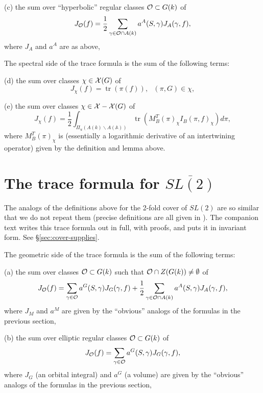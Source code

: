 \documentclass[12pt,letterpaper,openany]{book}
\theoremstyle{plain}
\theoremstyle{definition}
\theoremstyle{remark}
\theoremstyle{remark}
\newcommand{\tr}{\operatorname{tr}}
\begin{document}
(c) the sum over ``hyperbolic'' regular classes
${\cal{O}}\subset G(k)$
of
\begin{equation}
J_{\cal{O}}(f)=
{\frac{1}{2}}\sum_{\gamma\in {\cal O}\cap A(k)}
a^A(S,\gamma)J_A(\gamma,f),
\end{equation}
where $J_A$ and $a^A$ are as above,

The spectral side of the trace formula is the sum of the following terms:

(d) the sum over classes $\chi\in {\cal{X}}(G)$ of
\begin{equation}
J_\chi(f)=
\tr(\pi(f)),\ \ \ (\pi,G)\in\chi,
\end{equation}

(e) the sum over classes $\chi\in {\cal{X}}-{\cal{X}}(G)$ of
\begin{equation}
J_\chi(f)=
{\frac{1}{2}}\int_{\Pi_u(A(k)\backslash A({\mathbb{A}}))}
\tr(M_B^T(\pi)_\chi
I_B(\pi,f)_\chi)d\pi,
\end{equation}
where $M_B^T(\pi)_\chi$ is (essentially a logarithmic derivative
of an intertwining operator) given by the definition and lemma above.

\section{The trace formula for \texorpdfstring{$\overline{SL(2)}$}{SL(2)-bar}}

The analogs of the definitions above for the 2-fold cover of $SL(2)$
are so similar that we do not repeat them (precise definitions
are all given in \cite{J2}). The companion text \cite{JC} writes this
trace formula out in full, with proofs, and puts it in invariant form.
See \S\ref{sec:cover-supplies}.

The geometric side of the trace formula is the sum of the following terms:

(a) the sum over classes ${\cal{O}}\subset G(k)$
such that ${\cal{O}}\cap Z(G(k))\not= \emptyset$ of
\begin{equation}
J_{\cal{O}}(f)=
\sum_{\gamma\in {\cal O}}
a^G(S,\gamma)J_G(\gamma,f)+{\frac{1}{2}}
\sum_{\gamma\in {\cal O}\cap A(k)}
a^A(S,\gamma)J_A(\gamma,f),
\end{equation}
where $J_M$ and $a^M$
are given by the ``obvious'' analogs of the formulas
in the previous section,

(b) the sum over elliptic regular classes ${\cal{O}}\subset G(k)$
of
\begin{equation}
J_{\cal{O}}(f)=
\sum_{\gamma\in {\cal O}}
a^G(S,\gamma)J_G(\gamma,f),
\end{equation}
where $J_G$ (an orbital integral) and $a^G$ (a volume)
are given by the ``obvious'' analogs of the formulas
in the previous section,
\end{document}
